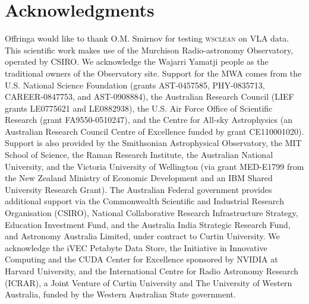 \documentclass[useAMS,usenatbib]{mn2e}
\DeclareRobustCommand{\TUSSEN}[3]{#2}
\begin{document}
\section*{Acknowledgments}
Offringa would like to thank O.M. Smirnov for testing \textsc{wsclean} on VLA data.
This scientific work makes use of the Murchison Radio-astronomy Observatory, operated by CSIRO. We acknowledge the Wajarri Yamatji people as the traditional owners of the Observatory site. Support for the MWA comes from the U.S. National Science Foundation (grants AST-0457585, PHY-0835713, CAREER-0847753, and AST-0908884), the Australian Research Council (LIEF grants LE0775621 and LE0882938), the U.S. Air Force Office of Scientific Research (grant FA9550-0510247), and the Centre for All-sky Astrophysics (an Australian Research Council Centre of Excellence funded by grant CE110001020). Support is also provided by the Smithsonian Astrophysical Observatory, the MIT School of Science, the Raman Research Institute, the Australian National University, and the Victoria University of Wellington (via grant MED-E1799 from the New Zealand Ministry of Economic Development and an IBM Shared University Research Grant). The Australian Federal government provides additional support via the Commonwealth Scientific and Industrial Research Organisation (CSIRO), National Collaborative Research Infrastructure Strategy, Education Investment Fund, and the Australia India Strategic Research Fund, and Astronomy Australia Limited, under contract to Curtin University. We acknowledge the iVEC Petabyte Data Store, the Initiative in Innovative Computing and the CUDA Center for Excellence sponsored by NVIDIA at Harvard University, and the International Centre for Radio Astronomy Research (ICRAR), a Joint Venture of Curtin University and The University of Western Australia, funded by the Western Australian State government. 

\DeclareRobustCommand{\TUSSEN}[3]{#3}




\label{lastpage}
\end{document}
